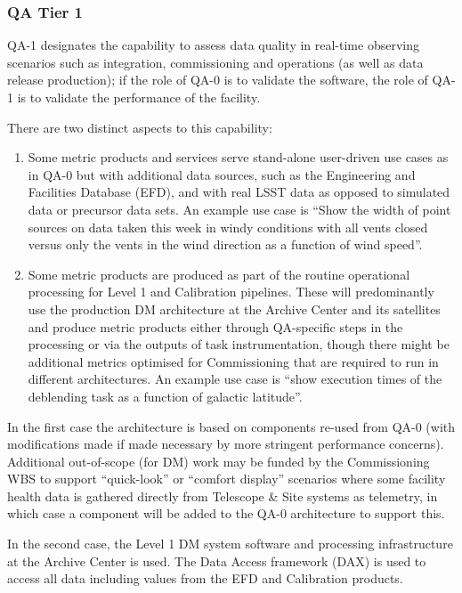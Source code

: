 \subsubsection{QA Tier 1}

QA-1 designates the capability to assess data quality in real-time observing scenarios such as integration, commissioning and operations (as well as data release production); if the role of QA-0 is to validate the software, the role of QA-1 is to validate the performance of the facility.

There are two distinct aspects to this capability:

\begin{enumerate}
\item Some metric products and services serve stand-alone user-driven use cases as in QA-0 but with additional data sources, such as the Engineering and Facilities Database (EFD), and with real LSST data as opposed to simulated data or precursor data sets.  An example use case is ``Show the width of point sources on data taken this week in windy conditions with all vents closed versus only the vents in the wind direction as a function of wind speed''.

\item Some metric products are produced as part of the routine operational processing for Level 1 and Calibration pipelines. These will predominantly use the production DM architecture at the Archive Center and its satellites and produce metric products either through QA-specific steps in the processing or via the outputs of task instrumentation, though there might be additional metrics optimised for Commissioning that are required to run in different architectures. An example use case is ``show execution times of the deblending task as a function of galactic latitude''.

\end{enumerate}

In the first case the architecture is based on components re-used from QA-0 (with modifications made if made necessary by more stringent performance concerns). Additional out-of-scope (for DM) work may be funded by the Commissioning WBS to support ``quick-look'' or ``comfort display'' scenarios where some facility health data is gathered directly from Telescope \& Site systems as telemetry, in which case a component will be added to the QA-0 architecture to support this.

In the second case, the Level 1 DM system software and processing infrastructure at the Archive Center is used. The Data Access framework (DAX) is used to access all data including values from the EFD and Calibration products.

